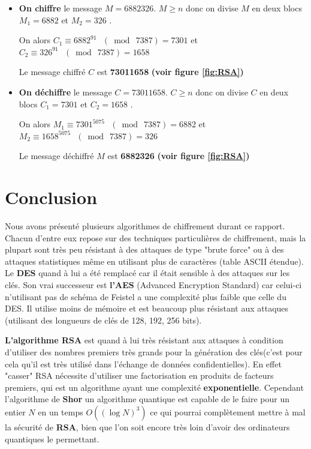 \documentclass{article}
\begin{document}
\begin{itemize}
\item \textbf{On chiffre} le message $M = 6882326$. $M \geq n$ donc on divise $M$ en deux blocs $M_1 = 6882$ et $M_2 = 326$ .

On alors $C_1 \equiv  6882 ^{91} \ \ \ (\bmod\ 7387) = 7301$ et $C_2 \equiv  326 ^{91} \ \ \ (\bmod\ 7387) = 1658$

Le message chiffré $C$ est \textbf{73011658} \textbf{(voir figure \ref{fig:RSA})}
\vspace{1\baselineskip}

\item \textbf{On déchiffre} le message $C = 73011658$. $C \geq n$ donc on divise $C$ en deux blocs $C_1 = 7301$ et $C_2 = 1658$ .

On alors $M_1 \equiv  7301 ^{5075} \ \ \ (\bmod\ 7387) = 6882$ et $M_2 \equiv  1658 ^{5075} \ \ \ (\bmod\ 7387) = 326$

Le message déchiffré $M$ est \textbf{6882326} \textbf{(voir figure \ref{fig:RSA})}
\end{itemize}

\section{Conclusion}

Nous avons présenté plusieurs algorithmes de chiffrement durant ce rapport. Chacun d'entre eux repose sur des techniques particulières de chiffrement, mais la plupart sont très peu résistant à des attaques de type "brute force" ou à des attaques statistiques même en utilisant plus de caractères (table ASCII étendue). Le \textbf{DES} quand à lui a été remplacé car il était sensible à des attaques sur les clés. Son vrai successeur est \textbf{l'AES} (Advanced Encryption Standard) car celui-ci n'utilisant pas de schéma de Feistel a une complexité plus faible que celle du DES. Il utilise moins de mémoire et est beaucoup plus résistant aux attaques (utilisant des longueurs de clés de 128, 192, 256 bits).

\textbf{L’algorithme RSA} est quand à lui très résistant aux attaques à condition d'utiliser des nombres premiers très grands pour la génération des clés(c'est pour cela qu'il est très utilisé dans l'échange de données confidentielles). En effet "casser" RSA nécessite d'utiliser une factorisation en produits de facteurs premiers, qui est un algorithme ayant une complexité \textbf{exponentielle}. Cependant l'algorithme de \textbf{Shor} un algorithme quantique est capable de le faire pour un entier $N$ en un temps $O((\log N)^3)$ ce qui pourrai complètement mettre à mal la sécurité de \textbf{RSA}, bien que l'on soit encore très loin d'avoir des ordinateurs quantiques le permettant.
\end{document}
